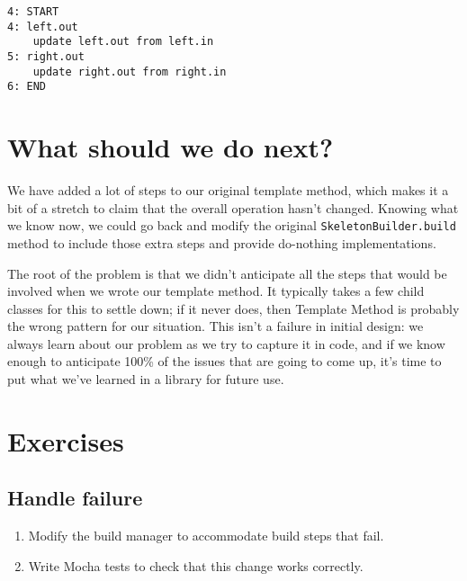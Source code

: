 \documentclass[krantzl]{krantz}
\begin{document}
\begin{lstlisting}[frame=tblr,backgroundcolor=\color{black!5}]
4: START
4: left.out
    update left.out from left.in
5: right.out
    update right.out from right.in
6: END
\end{lstlisting}


\section{What should we do next?}\label{build-manager-next}


We have added a lot of steps to our original template method,
which makes it a bit of a stretch to claim that the overall operation hasn’t changed.
Knowing what we know now,
we could go back and modify the original \texttt{SkeletonBuilder.build} method
to include those extra steps and provide do-nothing implementations.


The root of the problem is that we didn’t anticipate all the steps that would be involved
when we wrote our template method.
It typically takes a few child classes for this to settle down;
if it never does,
then Template Method is probably the wrong pattern for our situation.
This isn’t a failure in initial design:
we always learn about our problem as we try to capture it in code,
and if we know enough to anticipate 100\% of the issues that are going to come up,
it’s time to put what we’ve learned in a library for future use.

\section{Exercises}\label{build-manager-exercises}

\subsection*{Handle failure}

\begin{enumerate}

\item 

Modify the build manager to accommodate build steps that fail.



\item 

Write Mocha tests to check that this change works correctly.



\end{enumerate}
\end{document}
